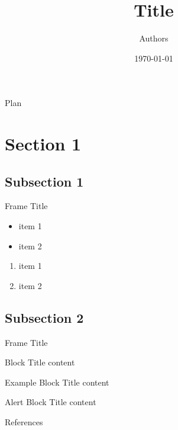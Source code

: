 \documentclass[svgnames, 9pt]{beamer}
\title[Short Title]{Title}
\author{Authors}
\date{\today}
\begin{document}
\begin{frame}
  \titlepage
\end{frame}

\begin{frame}{Plan}
  \tableofcontents
\end{frame}

\section{Section 1}

\subsection{Subsection 1}

\begin{frame}{Frame Title}
\begin{itemize}
    \item item 1
    \item item 2
\end{itemize}

\vfill

\begin{enumerate}
    \item item 1
    \item item 2
\end{enumerate}
\end{frame}

\subsection{Subsection 2}

\begin{frame}{Frame Title}
\begin{block}{Block Title}
    content
\end{block}

\vfill

\begin{exampleblock}{Example Block Title}
    content
\end{exampleblock}

\vfill

\begin{alertblock}{Alert Block Title}
    content
\end{alertblock}
\end{frame}


\begin{frame}[allowframebreaks]{References}
    
    
\end{frame}
\end{document}
